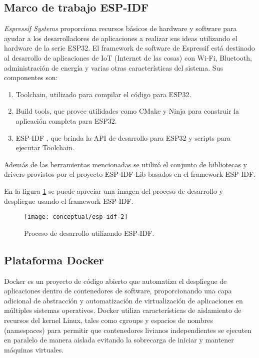 \subsection{Marco de trabajo ESP-IDF}

\textit{Espressif Systems} proporciona recursos básicos de hardware y software para ayudar a los desarrolladores de aplicaciones a realizar sus ideas utilizando el hardware de la serie ESP32. El framework de software de Espressif está destinado al desarrollo de aplicaciones de IoT (Internet de las cosas) con Wi-Fi, Bluetooth, administración de energía y varias otras características del sistema.
Sus componentes son:
\begin{enumerate}
	\item Toolchain, utilizado para compilar el código para ESP32.
	\item Build tools, que provee utilidades como CMake \cite{cmake_website} y Ninja \cite{ninja_website} para construir la aplicación completa para ESP32.
	\item ESP-IDF \cite{ESPIDF_home}, que brinda la API de desarrollo para ESP32 y scripts para ejecutar Toolchain.
	
\end{enumerate}

Además de las herramientas mencionadas se utilizó el conjunto de bibliotecas y drivers provistos por el proyecto ESP-IDF-Lib \cite{esp_idf_lib_website} basados en el framework ESP-IDF.

En la figura \ref{fig:esp-idf} se puede apreciar una imagen del proceso de desarrollo y despliegue usando el framework ESP-IDF.

\begin{figure}[h]
    \centering
    \texttt{[image: conceptual/esp-idf-2]}
    \caption{Proceso de desarrollo utilizando ESP-IDF\protect\footnotemark.}
    \label{fig:esp-idf}
\end{figure}


\subsection{Plataforma Docker}

Docker \cite{docker_website} es un proyecto de código abierto que automatiza el despliegue de aplicaciones dentro de contenedores de software, proporcionando una capa adicional de abstracción y automatización de virtualización de aplicaciones en múltiples sistemas operativos. Docker utiliza características de aislamiento de recursos del kernel Linux, tales como cgroups y espacios de nombres (namespaces) para permitir que contenedores livianos independientes se ejecuten en paralelo de manera aislada evitando la sobrecarga de iniciar y mantener máquinas virtuales.


